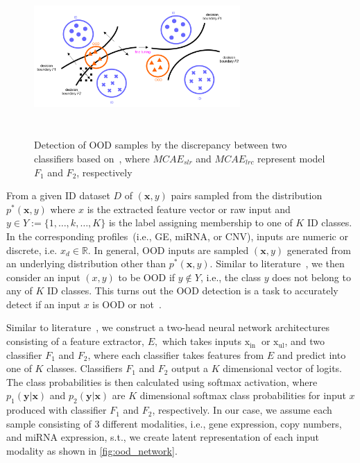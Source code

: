 \begin{figure}
    \centering
    \includegraphics[width=0.7\textwidth,height=60mm]{images/ood_ex_1.png}
    \caption{Detection of OOD samples by the discrepancy between two classifiers based on~\cite{OOD19}, where $MCAE_{slr}$ and $MCAE_{lrc}$ represent model $F_1$ and $F_2$, respectively}
    \label{fig:ood_detection_example}
    \vspace{-4mm}
\end{figure}

\hspace*{3.5mm} From a given ID dataset ${D}$ of $(\boldsymbol{x}, y)$ pairs sampled from the distribution $p^{*}(\boldsymbol{x}, y)$ where $x$ is the extracted feature vector or raw input and $y \in {Y}:=\{1, \ldots, k, \ldots, K\}$ is the label assigning membership to one of $K$ ID classes. In the corresponding profiles~(i.e., GE, miRNA, or CNV), inputs are numeric or discrete, i.e. $x_{d} \in \mathbb{R}$. In general, OOD inputs are sampled $(\boldsymbol{x}, y)$ generated from an underlying distribution other than $p^{*}(\boldsymbol{x}, y)$. Similar to literature~\cite{OOD1}, we then consider an input $(x, y)$ to be OOD if $y \notin {Y}$, i.e., the class $y$ does not belong to any of $K$ ID classes. This turns out the OOD detection is a task to accurately detect if an input $x$ is OOD or not~\cite{OOD1,OOD2,OOD3}.

\hspace*{3.5mm} Similar to literature~\cite{yu2019unsupervised}, we construct a two-head neural network architectures consisting of a feature extractor, $E,$ which takes inputs $\mathrm{x}_{\text {in }}$ or $\mathrm{x}_{\mathrm{ul}}$, and two classifier $F_{1}$ and $F_{2}$, where each classifier takes features from $E$ and predict into one of $K$ classes. Classifiers $F_{1}$ and $F_{2}$ output a $K$ dimensional vector of logits. The class probabilities is then calculated using softmax activation, where $p_{1}(\mathbf{y} | \mathbf{x})$ and $p_{2}(\mathbf{y} | \mathbf{x})$ are $K$ dimensional softmax class probabilities for input $x$ produced with classifier $F_{1}$ and $F_{2}$, respectively. In our case, we assume each sample consisting of 3 different modalities, i.e., gene expression, copy numbers, and miRNA expression, s.t., we create latent representation of each input modality as shown in \cref{fig:ood_network}. 

